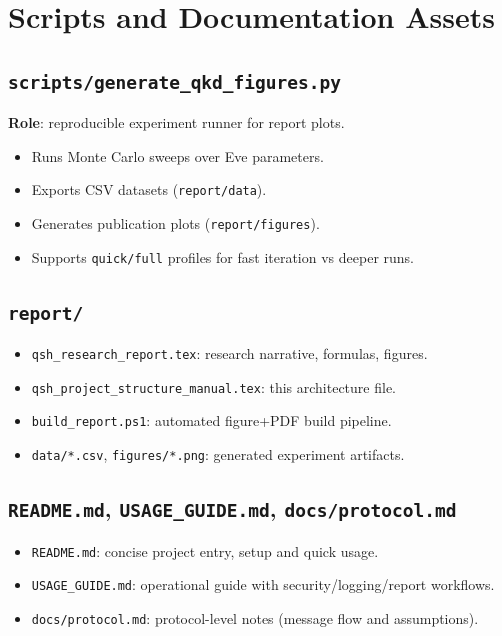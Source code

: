 \documentclass[11pt,a4paper]{article}
\begin{document}
\section{Scripts and Documentation Assets}

\subsection{\texttt{scripts/generate\_qkd\_figures.py}}
\textbf{Role}: reproducible experiment runner for report plots.
\begin{itemize}[leftmargin=1.4em]
  \item Runs Monte Carlo sweeps over Eve parameters.
  \item Exports CSV datasets (\texttt{report/data}).
  \item Generates publication plots (\texttt{report/figures}).
  \item Supports \texttt{quick/full} profiles for fast iteration vs deeper runs.
\end{itemize}

\subsection{\texttt{report/}}
\begin{itemize}[leftmargin=1.4em]
  \item \texttt{qsh\_research\_report.tex}: research narrative, formulas, figures.
  \item \texttt{qsh\_project\_structure\_manual.tex}: this architecture file.
  \item \texttt{build\_report.ps1}: automated figure+PDF build pipeline.
  \item \texttt{data/*.csv}, \texttt{figures/*.png}: generated experiment artifacts.
\end{itemize}

\subsection{\texttt{README.md}, \texttt{USAGE\_GUIDE.md}, \texttt{docs/protocol.md}}
\begin{itemize}[leftmargin=1.4em]
  \item \texttt{README.md}: concise project entry, setup and quick usage.
  \item \texttt{USAGE\_GUIDE.md}: operational guide with security/logging/report workflows.
  \item \texttt{docs/protocol.md}: protocol-level notes (message flow and assumptions).
\end{itemize}
\end{document}

